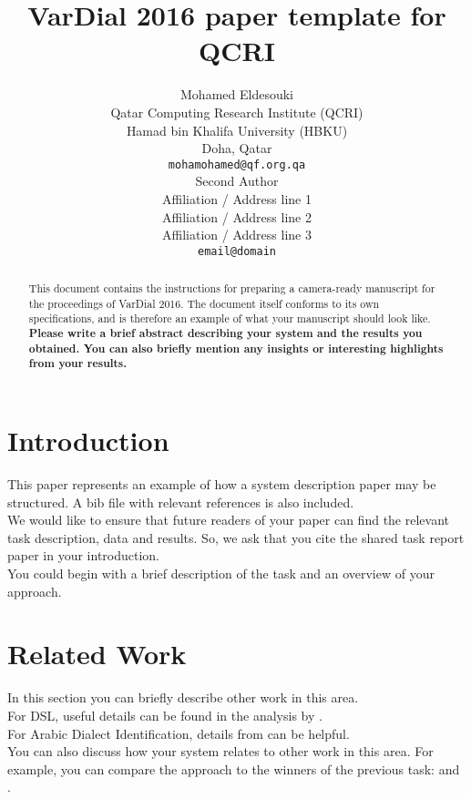 \documentclass[11pt]{article}
\title{VarDial 2016 paper template for QCRI}
\author{Mohamed Eldesouki \\
  Qatar Computing Research Institute (QCRI) \\
  Hamad bin Khalifa University (HBKU) \\
  Doha, Qatar \\
  {\tt mohamohamed@qf.org.qa} \\\And
  Second Author \\
  Affiliation / Address line 1 \\
  Affiliation / Address line 2 \\
  Affiliation / Address line 3 \\
  {\tt email@domain} \\}
\date{}
\begin{document}
\maketitle
\begin{abstract}
  This document contains the instructions for preparing a camera-ready
  manuscript for the proceedings of VarDial 2016. The document itself
  conforms to its own specifications, and is therefore an example of
  what your manuscript should look like. \bf Please write a brief abstract describing your system and the results you obtained. You can also briefly mention any insights or interesting highlights from your results.
\end{abstract}



\section{Introduction}
\label{intro}
\cite{Ali+2016}
This paper represents an example of how a system description paper may be structured. A bib file with relevant references is also included.
\\

We would like to ensure that future readers of your paper can find the relevant task description, data and results. So, we ask that you cite the shared task report paper \cite{dsl2016} in your introduction.
\\

You could begin with a brief description of the task and an overview of your approach. 


\section{Related Work}

In this section you can briefly describe other work in this area.
\\

For DSL, useful details can be found in the analysis by .
\\

For Arabic Dialect Identification, details from  can be helpful.
\\

You can also discuss how your system relates to other work in this area. For example, you can compare the approach to the winners of the previous task: \cite{malmasi-dras:2015:LT4VarDial} and \cite{goutte-leger:2015:LT4VarDial}.
\end{document}

